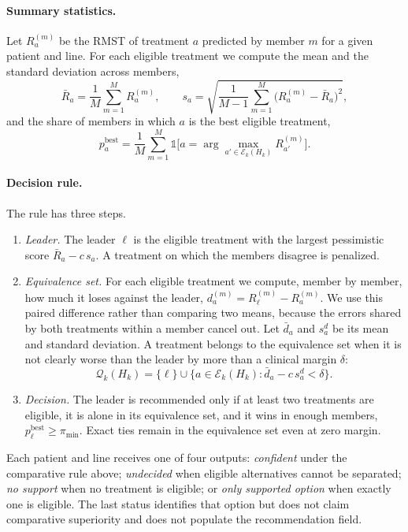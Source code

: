\documentclass[a4paper,10pt]{article}
\begin{document}
\paragraph{Summary statistics.} Let $R^{(m)}_a$ be the RMST of treatment $a$ predicted by member $m$ for a given patient and line. For each eligible treatment we compute the mean and the standard deviation across members,
\begin{equation}
    \bar{R}_a = \frac{1}{M}\sum_{m=1}^{M} R^{(m)}_a, \qquad
    s_a = \sqrt{\frac{1}{M-1}\sum_{m=1}^{M} \big(R^{(m)}_a - \bar{R}_a\big)^2},
\end{equation}
and the share of members in which $a$ is the best eligible treatment,
\begin{equation}
    p^{\text{best}}_a = \frac{1}{M}\sum_{m=1}^{M} \mathbb{1}\Big[a = \arg\max_{a' \in \mathcal{E}_k(H_k)} R^{(m)}_{a'}\Big].
\end{equation}

\paragraph{Decision rule.} The rule has three steps.
\begin{enumerate}
    \item \emph{Leader.} The leader $\ell$ is the eligible treatment with the largest pessimistic score $\bar{R}_a - c\, s_a$. A treatment on which the members disagree is penalized.
    \item \emph{Equivalence set.} For each eligible treatment we compute, member by member, how much it loses against the leader, $d^{(m)}_a = R^{(m)}_\ell - R^{(m)}_a$. We use this paired difference rather than comparing two means, because the errors shared by both treatments within a member cancel out. Let $\bar{d}_a$ and $s^d_a$ be its mean and standard deviation. A treatment belongs to the equivalence set when it is not clearly worse than the leader by more than a clinical margin $\delta$:
    \begin{equation}
        \mathcal{Q}_k(H_k) = \{\ell\} \cup \big\{a \in \mathcal{E}_k(H_k) : \bar{d}_a - c\, s^d_a < \delta\big\}.
    \end{equation}
    \item \emph{Decision.} The leader is recommended only if at least two treatments are eligible, it is alone in its equivalence set, and it wins in enough members, $p^{\text{best}}_\ell \geq \pi_{\min}$. Exact ties remain in the equivalence set even at zero margin.
\end{enumerate}
Each patient and line receives one of four outputs: \emph{confident} under the comparative rule above; \emph{undecided} when eligible alternatives cannot be separated; \emph{no support} when no treatment is eligible; or \emph{only supported option} when exactly one is eligible. The last status identifies that option but does not claim comparative superiority and does not populate the recommendation field.
\end{document}
